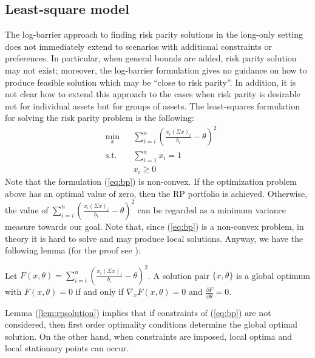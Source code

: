 \subsection{Least-square model}
The log-barrier approach to finding risk parity solutions in the long-only setting does not immediately extend to scenarios with additional constraints or preferences. In particular, when general bounds are added, risk parity solution may not exist; moreover, the log-barrier formulation gives no guidance on how to produce feasible solution which may be “close to risk parity”. In addition, it is not clear how to extend this approach to the cases when risk parity is desirable not for individual assets but for groups of assets. The least-squares formulation for solving the risk parity problem is the following:
\begin{equation}\label{eq:bp}
\begin{aligned}
& \min_x
&& \sum_{i=i}^n \left( \frac{x_i(\Sigma x)_i}{b_i} - \theta \right)^2\\
& \text{s.t.}
&&\sum_{i=1}^n x_i =1\\
&&&x_i \geq 0
\end{aligned}
\end{equation}
Note that the formulation (\ref{eq:bp}) is non-convex.  If the optimization problem above has an optimal value of zero, then the RP portfolio is achieved. Otherwise, the value of $\sum_{i=i}^n \left( \frac{x_i(\Sigma x)_i}{b_i} - \theta\right)^2$  can be regarded as a minimum variance measure towards our goal. Note that, since (\ref{eq:bp}) is a non-convex problem, in theory it is hard to solve and may produce local solutions. Anyway, we have the following lemma (for the proof see \cite{tutuncu}):
\begin{lemma}\label{lem:rpsolution}
Let $F(x,\theta) = \sum_{i=i}^n \left( \frac{x_i(\Sigma x)_i}{b_i} - \theta \right)^2$. A solution pair $\{x,\theta\}$ is a global optimum with $F(x,\theta)=0$ if and only if $\nabla_xF(x,\theta) = 0$ and $\frac{\partial F}{\partial \theta} = 0$.
\end{lemma}
Lemma (\ref{lem:rpsolution}) implies that if constraints of (\ref{eq:bp}) are not considered, then first order optimality conditions determine the global optimal solution. On the other hand, when constraints are imposed, local optima and local stationary points can occur.
